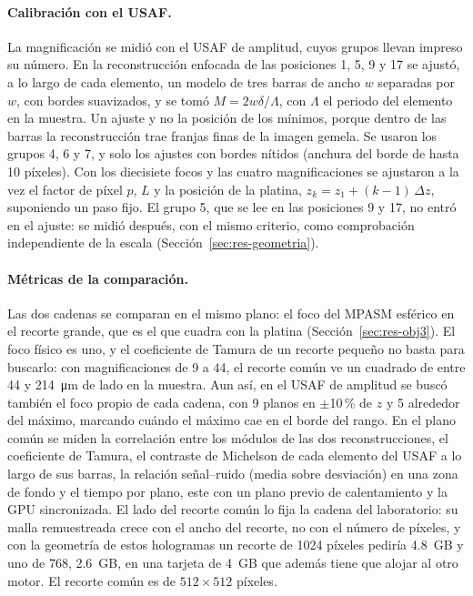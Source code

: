 \paragraph{Calibración con el USAF.} La magnificación se midió con el USAF
de amplitud, cuyos grupos llevan impreso su número. En la reconstrucción
enfocada de las posiciones 1, 5, 9 y 17 se ajustó, a lo largo de cada
elemento, un modelo de tres barras de ancho $w$ separadas por $w$, con bordes
suavizados, y se tomó $M = 2w\delta/\Lambda$, con $\Lambda$ el periodo del
elemento en la muestra. Un ajuste y no la posición de los mínimos, porque
dentro de las barras la reconstrucción trae franjas finas de la imagen
gemela. Se usaron los grupos 4, 6 y 7, y solo los ajustes con bordes nítidos
(anchura del borde de hasta 10 píxeles). Con los diecisiete focos y las
cuatro magnificaciones se ajustaron a la vez el factor de píxel $p$, $L$ y la
posición de la platina, $z_k = z_1 + (k - 1)\,\Delta z$, suponiendo un paso
fijo. El grupo 5, que se lee en las posiciones 9 y 17, no entró en el ajuste:
se midió después, con el mismo criterio, como comprobación independiente de
la escala (Sección~\ref{sec:res-geometria}).

\paragraph{Métricas de la comparación.} Las dos cadenas se comparan en el
mismo plano: el foco del MPASM esférico en el recorte grande, que es el que
cuadra con la platina (Sección~\ref{sec:res-obj3}). El foco físico es uno, y
el coeficiente de Tamura de un recorte pequeño no basta para buscarlo: con
magnificaciones de 9 a 44, el recorte común ve un cuadrado de entre 44 y
\SI{214}{\micro\metre} de lado en la muestra. Aun así, en el USAF de amplitud se buscó también el foco
propio de cada cadena, con 9 planos en $\pm$10\,\% de $z$ y 5 alrededor del
máximo, marcando cuándo el máximo cae en el borde del rango. En el plano
común se miden la correlación entre los módulos de las dos reconstrucciones,
el coeficiente de Tamura, el contraste de Michelson de cada elemento del USAF
a lo largo de sus barras, la relación señal--ruido (media sobre desviación) en
una zona de fondo y el tiempo por plano, este con un plano previo de
calentamiento y la GPU sincronizada. El lado del recorte común lo fija la
cadena del laboratorio: su malla remuestreada crece con el ancho del recorte,
no con el número de píxeles, y con la geometría de estos hologramas un recorte
de 1024 píxeles pediría \SI{4.8}{GB} y uno de 768, \SI{2.6}{GB}, en una
tarjeta de \SI{4}{GB} que además tiene que alojar al otro motor. El recorte
común es de $512\times512$ píxeles.
